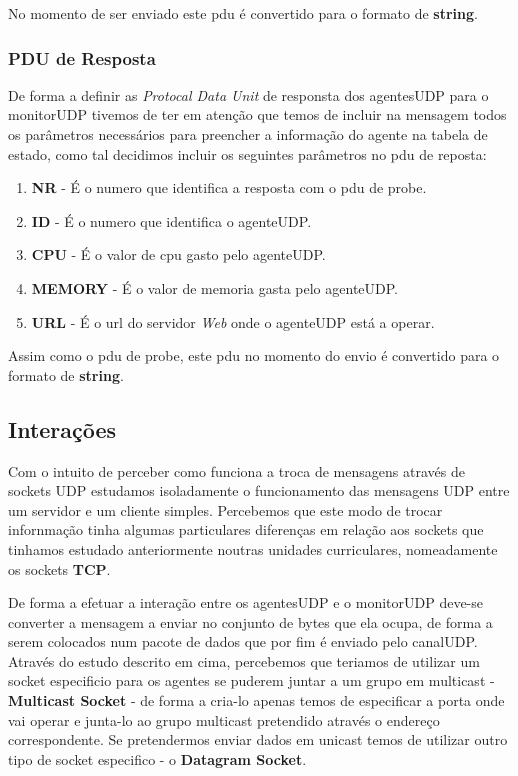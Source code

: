 \documentclass{llncs}
\begin{document}
			No momento de ser enviado este pdu é convertido para o formato de \textbf{string}.

		\subsubsection{PDU de Resposta} 

			De forma a definir as \textit{Protocal Data Unit} de responsta dos agentesUDP para o monitorUDP tivemos de ter em atenção que temos de incluir na mensagem todos os parâmetros necessários para preencher a informação do agente na tabela de estado, como tal decidimos incluir os seguintes parâmetros no pdu de reposta: 

				\begin{enumerate}

					\item \textbf{NR} - É o numero que identifica a resposta com o pdu de probe.

					\item \textbf{ID} - É o numero que identifica o agenteUDP.

					\item \textbf{CPU} - É o valor de cpu gasto pelo agenteUDP.

					\item \textbf{MEMORY} - É o valor de memoria gasta pelo agenteUDP.

					\item \textbf{URL} - É o url do servidor \textit{Web} onde o agenteUDP está a operar.

				\end{enumerate}

			Assim como o pdu de probe, este pdu no momento do envio é convertido para o formato de \textbf{string}.

	\subsection{Interações}

		Com o intuito de perceber como funciona a troca de mensagens através de sockets UDP estudamos isoladamente o funcionamento das mensagens UDP entre um servidor e um cliente simples. Percebemos que este modo de trocar infornmação tinha algumas particulares diferenças em relação aos sockets que tinhamos estudado anteriormente noutras unidades curriculares, nomeadamente os sockets \textbf{TCP}.

		De forma a efetuar a interação entre os agentesUDP e o monitorUDP deve-se converter a mensagem a enviar no conjunto de bytes que ela ocupa, de forma a serem colocados num pacote de dados que por fim é enviado pelo canalUDP. Através do estudo descrito em cima, percebemos que teriamos de utilizar um socket especificio para os agentes se puderem juntar a um grupo em multicast - \textbf{Multicast Socket} - de forma a cria-lo apenas temos de especificar a porta onde vai operar e junta-lo ao grupo multicast pretendido através o endereço correspondente. Se pretendermos enviar dados em unicast temos de utilizar outro tipo de socket especifico - o \textbf{Datagram Socket}.
\end{document}
